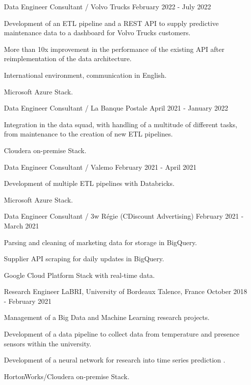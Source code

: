 \begin{cventries}
	\cventry
	{Data Engineer Consultant / Volvo Trucks}{}{}
	{February 2022 - July 2022}
	{
		\begin{cvitems}
			\item Development of an ETL pipeline and a REST API to supply predictive maintenance data to a dashboard for Volvo Trucks customers.
			\item More than 10x improvement in the performance of the existing API after reimplementation of the data architecture.
			\item International environment, communication in English.
			\item Microsoft Azure Stack.
		\end{cvitems}
	}
	
	\cventry
	{Data Engineer Consultant / La Banque Postale}{}{}
	{April 2021 - January 2022}
	{
		\begin{cvitems}
			\item Integration in the data squad, with handling of a multitude of different tasks, from maintenance to the creation of new ETL pipelines.
			\item Cloudera on-premise Stack.
		\end{cvitems}
	}
	
	\newpage

	\cventry
	{Data Engineer Consultant / Valemo}{}{}
	{February 2021 - April 2021}
	{
		\begin{cvitems}
			\item Development of multiple ETL pipelines with Databricks.
			\item Microsoft Azure Stack.
		\end{cvitems}
	}
	
	\cventry
	{Data Engineer Consultant / 3w Régie (CDiscount Advertising)}{}{}
	{February 2021 - March 2021}
	{
		\begin{cvitems}
			\item Parsing and cleaning of marketing data for storage in BigQuery.
			\item Supplier API scraping for daily updates in BigQuery.
			\item Google Cloud Platform Stack with real-time data.
		\end{cvitems}
	}
	
	\cventry
	{Research Engineer}
	{LaBRI, University of Bordeaux}
	{Talence, France}
	{October 2018 - February 2021}
	{
		\begin{cvitems}
			\item Management of a Big Data and Machine Learning research projects.
			\item Development of a data pipeline to collect data from temperature and presence sensors within the university.
			\item Development of a neural network for research into time series prediction .
			\item HortonWorks/Cloudera on-premise Stack.
		\end{cvitems}
	}
	
\end{cventries}